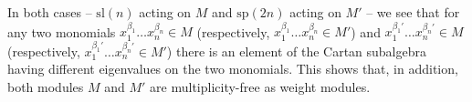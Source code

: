 \documentclass[12pt]{report}
\newcommand{\sL}{\mathrm{sl}}
\newcommand{\sP}{\mathrm{sp}}
\newcommand{\gl}{\mathrm{gl}}
\newcommand{\so}{\mathrm{so}}
\begin{document}
In both cases -- $\sL(n)$ acting on $M$ and $\sP(2n)$ acting on $M'$ -- we see that for any two monomials $x_1^{\beta_1}\dots x_n^{\beta_n}\in M$ (respectively, $x_1^{\beta_1}\dots x_n^{\beta_n}\in M'$) and $x_1^{\beta_1'}\dots x_n^{\beta_n'}\in M$ (respectively, $x_1^{\beta_1'}\dots x_n^{\beta_n'}\in M'$) there is an element of the Cartan subalgebra having different eigenvalues on the two monomials. This shows that, in addition,  both modules $M$ and $M'$ are multiplicity-free as weight modules.

\end{document}
